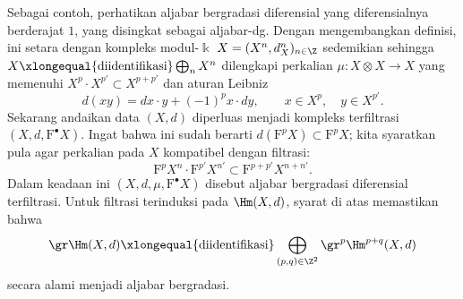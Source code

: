 Sebagai contoh, perhatikan aljabar bergradasi diferensial yang diferensialnya
berderajat $1$, yang disingkat sebagai aljabar-dg. Dengan mengembangkan
definisi, ini setara dengan kompleks modul-$\Bbbk$
$X=(X^n,d_X^n)_{n\in\Z}$ sedemikian sehingga
$X\xlongequal{\text{diidentifikasi}}\bigoplus_nX^n$ dilengkapi perkalian
$\mu:X\otimes X\to X$ yang memenuhi $X^p\cdot X^{p'}\subset X^{p+p'}$ dan
aturan Leibniz
\[ d(xy)=dx\cdot y+(-1)^px\cdot dy,
	\qquad x\in X^p,\quad y\in X^{p'}. \]
Sekarang andaikan data $(X,d)$ diperluas menjadi kompleks terfiltrasi
$(X,d,\mathrm{F}^\bullet X)$. Ingat bahwa ini sudah berarti
$d(\mathrm{F}^pX)\subset\mathrm{F}^pX$; kita syaratkan pula agar perkalian
pada $X$ kompatibel dengan filtrasi:
\[ \mathrm{F}^pX^n\cdot\mathrm{F}^{p'}X^{n'}
	\subset\mathrm{F}^{p+p'}X^{n+n'}. \]
Dalam keadaan ini $(X,d,\mu,\mathrm{F}^\bullet X)$ disebut aljabar bergradasi
diferensial terfiltrasi. Untuk filtrasi terinduksi pada $\Hm(X,d)$, syarat di
atas memastikan bahwa
\[ \gr\Hm(X,d)\xlongequal{\text{diidentifikasi}}
	\bigoplus_{(p,q)\in\Z^2}\gr^p\Hm^{p+q}(X,d) \]
secara alami menjadi aljabar bergradasi.

